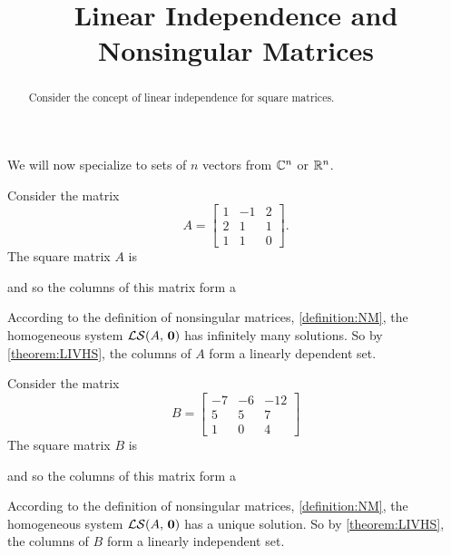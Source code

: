 \documentclass{ximera}
\title{Linear Independence and Nonsingular Matrices}
\begin{document}
\begin{abstract}
  Consider the concept of linear independence for square matrices.
\end{abstract}
\maketitle

We will now specialize to sets of $n$ vectors from $\mathbb{C}^{n}$ or $\mathbb{R}^{n}$.

\begin{example}%
  Consider the matrix
  \[
    A = \begin{bmatrix}
      1 & -1 & 2\\
      2 & 1 & 1\\
      1 & 1 & 0
    \end{bmatrix}.
  \]
  The square matrix $A$ is
  \begin{multipleChoice}
  \end{multipleChoice}
  and so the columns of this matrix form a
  \begin{multipleChoice}
  \end{multipleChoice}

  \begin{feedback}[correct]
    According to the definition of nonsingular matrices,
    \ref{definition:NM}, the homogeneous system $\mathcal{LS}\!\left(A,\,\mathbf{0}\right)$ has
    infinitely many solutions.  So by \ref{theorem:LIVHS}, the columns
    of $A$ form a linearly dependent set.
  \end{feedback}
\end{example}

\begin{example}%
  Consider the matrix
  \[
    B = \begin{bmatrix}
      -7&-6&-12\\
      5&5&7\\
      1&0&4
    \end{bmatrix}
  \]
  The square matrix $B$ is
  \begin{multipleChoice}
  \end{multipleChoice}
  and so the columns of this matrix form a
  \begin{multipleChoice}
  \end{multipleChoice}

  \begin{feedback}[correct]
    According to the definition of nonsingular matrices,
    \ref{definition:NM}, the homogeneous system $\mathcal{LS}\!\left(A,\,\mathbf{0}\right)$ has a
    unique solution.  So by \ref{theorem:LIVHS}, the columns of $B$
    form a linearly independent set.
  \end{feedback}

\end{example}
\end{document}
